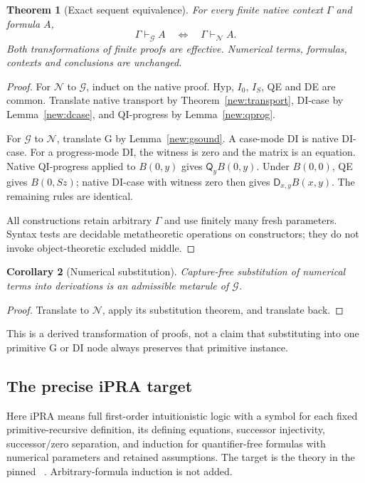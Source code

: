 \documentclass[11pt,letterpaper]{article}
\newtheorem{theorem}{Theorem}[section]
\newtheorem{corollary}[theorem]{Corollary}
\theoremstyle{definition}
\theoremstyle{remark}
\newcommand{\D}{\mathsf D}
\newcommand{\Q}{\mathsf Q}
\newcommand{\Ncal}{\mathcal N}
\newcommand{\Gcal}{\mathcal G}
\newcommand{\code}[1]{\texttt{\detokenize{#1}}}
\begin{document}
\begin{theorem}[Exact sequent equivalence]\label{new:main}
For every finite native context $\Gamma$ and formula $A$,
\[
       \Gamma\vdash_{\Gcal}A
       \quad\Longleftrightarrow\quad
       \Gamma\vdash_{\Ncal}A.
\]
Both transformations of finite proofs are effective. Numerical terms,
formulas, contexts and conclusions are unchanged.
\end{theorem}
\begin{proof}
For $\Ncal$ to $\Gcal$, induct on the native proof.
Hyp, $I_0$, $I_S$, QE and DE are common. Translate native transport by
Theorem~\ref{new:transport}, DI-case by Lemma~\ref{new:dcase}, and
QI-progress by Lemma~\ref{new:qprog}.

For $\Gcal$ to $\Ncal$, translate G by Lemma~\ref{new:gsound}.
A case-mode DI is native DI-case. For a progress-mode DI, the witness
is zero and the matrix is an equation. Native QI-progress applied to
$B(0,y)$ gives $\Q_yB(0,y)$. Under $B(0,0)$, QE gives $B(0,Sz)$;
native DI-case with witness zero then gives $\D_{x,y}B(x,y)$.
The remaining rules are identical.

All constructions retain arbitrary $\Gamma$ and use finitely many fresh
parameters. Syntax tests are decidable metatheoretic operations on
constructors; they do not invoke object-theoretic excluded middle.
\end{proof}

\begin{corollary}[Numerical substitution]\label{new:subst}
Capture-free substitution of numerical terms into derivations is an
admissible metarule of $\Gcal$.
\end{corollary}
\begin{proof}
Translate to $\Ncal$, apply its substitution theorem, and translate back.
\end{proof}

This is a derived transformation of proofs, not a claim that substituting
into one primitive G or DI node always preserves that primitive instance.

\subsection{The precise iPRA target}

Here iPRA means full first-order intuitionistic logic with a symbol for
each fixed primitive-recursive definition, its defining equations,
successor injectivity, successor/zero separation, and induction for
quantifier-free formulas with numerical parameters and retained
assumptions. The target is the \code{PRAAx} theory in the pinned
\code{PR.lean}~\cite{native}. Arbitrary-formula induction is not added.
\end{document}
